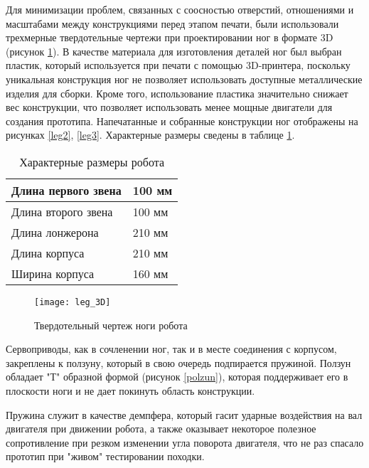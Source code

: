 Для минимизации проблем, связанных с соосностью отверстий, отношениями и масштабами между конструкциями перед этапом печати, были использовали трехмерные твердотельные чертежи при проектировании ног в формате 3D (рисунок \ref{leg_3D}). В качестве материала для изготовления деталей ног был выбран пластик, который используется при печати с помощью 3D-принтера, поскольку уникальная конструкция ног не позволяет использовать доступные металлические изделия для сборки. Кроме того, использование пластика значительно снижает вес конструкции, что позволяет использовать менее мощные двигатели для создания прототипа. Напечатанные и собранные конструкции ног отображены на рисунках \ref{leg2}, \ref{leg3}. Характерные размеры сведены в таблице \ref{charac_table}.

\begin{table}[h]
	\begin{center}
		\caption{Характерные размеры робота}
		\label{charac_table}
		\begin{tabular}{| l | l |}
			\hline
			Длина первого звена & 100 мм\\ \hline
			Длина второго звена & 100 мм \\ \hline
			Длина лонжерона & 210 мм \\ \hline
			Длина корпуса & 210 мм \\ \hline
			Ширина корпуса & 160 мм \\ \hline
		\end{tabular}
	\end{center}
\end{table}

\newpage  
\begin{figure}[h!]
	\begin{center}
		\texttt{[image: leg\_3D]}
		\caption{Твердотельный чертеж ноги робота}
		\label{leg_3D}
	\end{center}
\end{figure}

Сервоприводы, как в сочленении ног, так и в месте соединения с корпусом, закреплены к ползуну, который в свою очередь подпирается пружиной. Ползун обладает "Т" \space образной формой (рисунок \ref{polzun}), которая поддерживает его в плоскости ноги и не дает покинуть область конструкции. 

Пружина служит в качестве демпфера, который гасит ударные воздействия на вал двигателя при движении робота, а также оказывает некоторое полезное сопротивление при резком изменении угла поворота двигателя, что не раз спасало прототип при "живом" \space тестировании походки.

